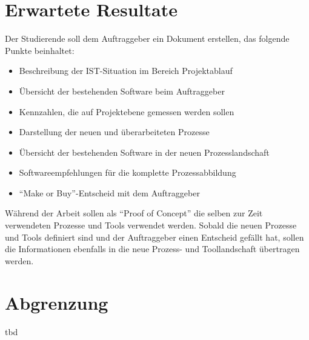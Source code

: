 \section{Erwartete Resultate}
Der Studierende soll dem Auftraggeber ein Dokument erstellen, das folgende 
Punkte beinhaltet: 

\begin{itemize}
    \item Beschreibung der IST-Situation im Bereich Projektablauf
    \item Übersicht der bestehenden Software beim Auftraggeber
    \item Kennzahlen, die auf Projektebene gemessen werden sollen
    \item Darstellung der neuen und überarbeiteten Prozesse
    \item Übersicht der bestehenden Software in der neuen Prozesslandschaft
    \item Softwareempfehlungen für die komplette Prozessabbildung
    \item ``Make or Buy''-Entscheid mit dem Auftraggeber
\end{itemize}

Während der Arbeit sollen als ``Proof of Concept'' die selben zur Zeit verwendeten
Prozesse und Tools verwendet werden. Sobald die neuen Prozesse und Tools
definiert sind und der Auftraggeber einen Entscheid gefällt hat, sollen die
Informationen ebenfalls in die neue Prozess- und Toollandschaft übertragen werden.

\section{Abgrenzung}
tbd

